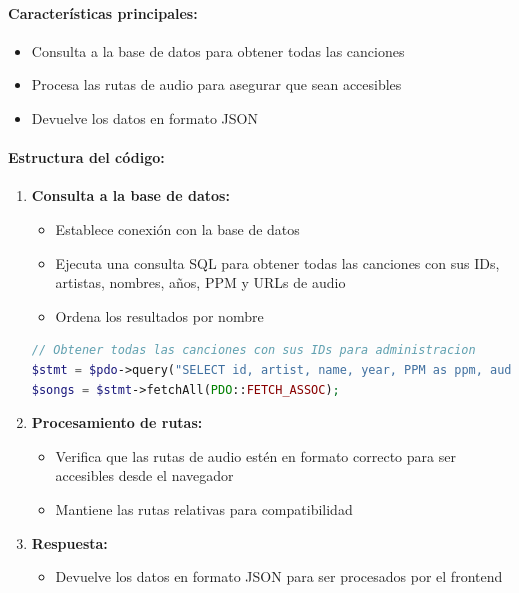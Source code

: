 \documentclass[a4paper,12pt]{article}
\begin{document}
\paragraph{Características principales:}
\begin{itemize}
    \item Consulta a la base de datos para obtener todas las canciones
    \item Procesa las rutas de audio para asegurar que sean accesibles
    \item Devuelve los datos en formato JSON
\end{itemize}

\paragraph{Estructura del código:}
\begin{enumerate}
    \item \textbf{Consulta a la base de datos:}
    \begin{itemize}
        \item Establece conexión con la base de datos
        \item Ejecuta una consulta SQL para obtener todas las canciones con sus IDs, artistas, nombres, años, PPM y URLs de audio
        \item Ordena los resultados por nombre
    \end{itemize}
    
    \begin{lstlisting}[language=PHP]
// Obtener todas las canciones con sus IDs para administracion
$stmt = $pdo->query("SELECT id, artist, name, year, PPM as ppm, audioUrl FROM songs ORDER BY name ASC");
$songs = $stmt->fetchAll(PDO::FETCH_ASSOC);
    \end{lstlisting}
    
    \item \textbf{Procesamiento de rutas:}
    \begin{itemize}
        \item Verifica que las rutas de audio estén en formato correcto para ser accesibles desde el navegador
        \item Mantiene las rutas relativas para compatibilidad
    \end{itemize}
    
    \item \textbf{Respuesta:}
    \begin{itemize}
        \item Devuelve los datos en formato JSON para ser procesados por el frontend
    \end{itemize}
\end{enumerate}
\end{document}
